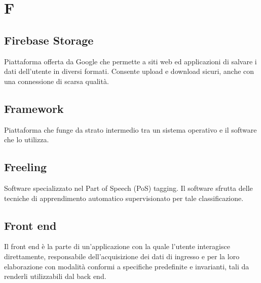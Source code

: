 \section*{F}
\subsection*{Firebase Storage}
Piattaforma offerta da Google che permette a siti web ed applicazioni di salvare i dati dell'utente in diversi formati. Consente upload e download sicuri, anche con una connessione di scarsa qualità.

\subsection*{Framework}
Piattaforma che funge da strato intermedio tra un sistema operativo e il software che lo utilizza.

\subsection*{Freeling}
Software specializzato nel Part of Speech (PoS) tagging\glo. Il software sfrutta delle tecniche di apprendimento automatico supervisionato per tale classificazione.  

\subsection*{Front end}
Il front end è la parte di un'applicazione con la quale l'utente interagisce direttamente, responsabile dell’acquisizione dei dati di ingresso e per la loro elaborazione con modalità conformi a specifiche predefinite e invarianti, tali da renderli utilizzabili dal back end. 

